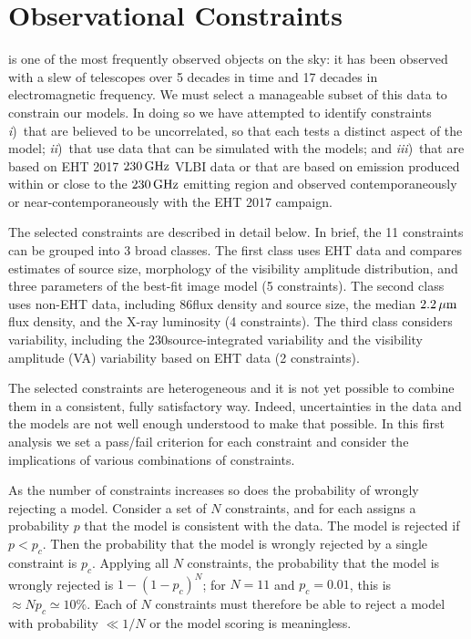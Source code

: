 \section{Observational Constraints}\label{sec:observations}

\sgra is one of the most frequently observed objects on the sky: it has been observed with a slew of telescopes over 5 decades in time and 17 decades in electromagnetic frequency.
We must select a manageable subset of this data to constrain our models.
In doing so we have attempted to identify constraints 
\emph{i})~that are believed to be uncorrelated, so that each tests a distinct aspect of the model;
\emph{ii})~that use data that can be simulated with the models; and
\emph{iii})~that are based on EHT 2017 $230\,\mathrm{GHz}$ VLBI data or that are based on emission produced within or close to the $230\,\mathrm{GHz}$ emitting region and observed contemporaneously or near-contemporaneously with the EHT 2017 campaign.

The selected constraints are described in detail below.
In brief, the 11 constraints can be grouped into 3 broad classes.
The first class uses EHT data and compares estimates of source size, morphology of the visibility amplitude distribution, and three parameters of the best-fit \mring image model (5 constraints).
The second class uses non-EHT data, including 86\GHz flux density and source size, the median $2.2\,\mu\mathrm{m}$ flux density, and the X-ray luminosity (4 constraints).
The third class considers variability, including the 230\GHz source-integrated variability and the visibility amplitude (VA) variability based on EHT data (2 constraints).

The selected constraints are heterogeneous and it is not yet possible to combine them in a consistent, fully satisfactory way.
Indeed, uncertainties in the data and the models are not well enough understood to make that possible.
In this first analysis we set a pass/fail criterion for each constraint and consider the implications of various combinations of constraints.

As the number of constraints increases so does the probability of wrongly rejecting a model.
Consider a set of $N$ constraints, and for each assigns a probability $p$ that the model is consistent with the data.
The model is rejected if $p < p_c$.
Then the probability that the model is wrongly rejected by a single constraint is $p_c$.
Applying all $N$ constraints, the probability that the model is wrongly rejected is $1 - (1 - p_c)^N$; for $N = 11$ and $p_c = 0.01$, this is $\approx N p_c \simeq 10\%$.
Each of $N$ constraints must therefore be able to reject a model with probability $\ll 1/N$ or the model scoring is meaningless.

